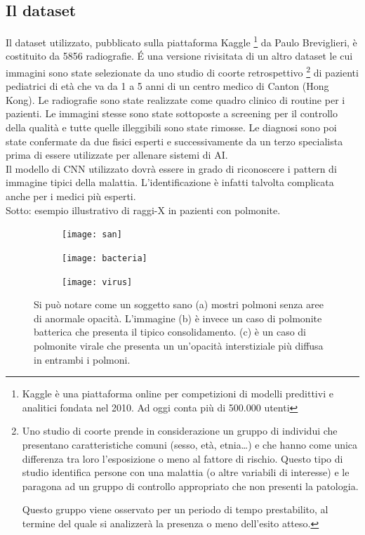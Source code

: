 \subsection{Il dataset}
Il dataset utilizzato,
 pubblicato sulla piattaforma Kaggle \footnote{Kaggle è una piattaforma online per competizioni di modelli predittivi e analitici fondata nel 2010. Ad oggi conta più di 500.000 utenti} da Paulo Breviglieri, è costituito da 5856 radiografie.
 É una versione rivisitata di un altro dataset le cui immagini sono state selezionate da uno studio di coorte retrospettivo \footnote{Uno studio di coorte prende in considerazione un gruppo di individui che presentano caratteristiche comuni (sesso, età, etnia…) e che hanno come unica differenza tra loro l’esposizione o meno al fattore di rischio. Questo tipo di studio identifica persone con una malattia (o altre variabili di interesse) e le paragona ad un gruppo di controllo appropriato che non presenti la patologia.

 Questo gruppo viene osservato per un periodo di tempo prestabilito, al termine del quale si analizzerà la presenza o meno dell’esito atteso.} di pazienti pediatrici di età che va da 1 a 5 anni di un centro medico di Canton (Hong Kong). Le radiografie sono state realizzate come quadro clinico di routine per i pazienti. Le immagini stesse sono state sottoposte a screening per il controllo della qualità e tutte quelle illeggibili sono state rimosse. Le diagnosi sono poi state confermate da due fisici esperti e successivamente da un terzo specialista prima di essere utilizzate per allenare sistemi di AI. \\
 Il modello di CNN utilizzato dovrà essere in grado di riconoscere i pattern di immagine tipici della malattia. L’identificazione è infatti talvolta complicata anche per i medici più esperti. \\
Sotto: esempio illustrativo di raggi-X in pazienti con polmonite. 
\begin{figure}[hb!]
\begin{subfigure}{.32\textwidth}
  \centering
  \texttt{[image: san]}
  \caption{}
  \label{fig:snap1}
\end{subfigure}%
\begin{subfigure}{.32\textwidth}
  \centering
  \texttt{[image: bacteria]}
  \caption{}
  \label{fig:snap2}
\end{subfigure}%
\begin{subfigure}{.32\textwidth}
  \centering
  \texttt{[image: virus]}
  \caption{}
  \label{fig:snap3}
\end{subfigure}
\caption{Si può notare come un soggetto sano (a) mostri polmoni senza aree di anormale opacità. L’immagine (b) è invece un caso di polmonite batterica che presenta il tipico consolidamento. (c) è un caso di polmonite virale che presenta un un'opacità interstiziale più diffusa in entrambi i polmoni.}
\label{fig:fig}
\end{figure} 

